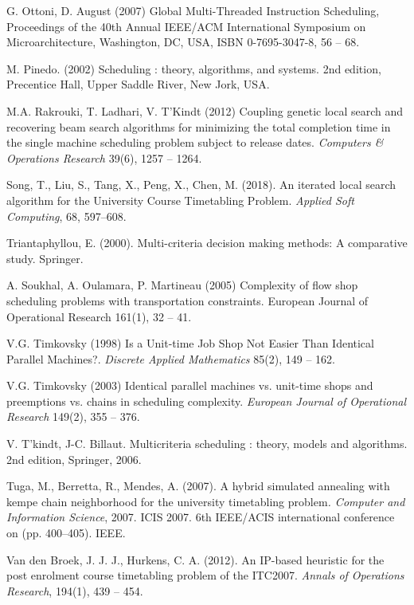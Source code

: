 \documentclass[11pt]{article}
\begin{document}
\begin{thebibliography}{19}
G. Ottoni, D. August (2007) 
Global Multi-Threaded Instruction Scheduling, Proceedings of the 40th Annual IEEE/ACM International Symposium on Microarchitecture, Washington, DC, USA, ISBN 0-7695-3047-8, 56 -- 68.

M. Pinedo. (2002)
Scheduling : theory, algorithms, and systems. 2nd edition, Precentice Hall, Upper Saddle River, New Jork, USA.

M.A. Rakrouki, T. Ladhari, V. T'Kindt (2012) 
Coupling genetic local search and recovering beam search algorithms for minimizing the total completion time in the single machine scheduling problem subject to release dates. 
\textit{Computers \& Operations Research} 39(6), 1257 -- 1264.

Song, T., Liu, S., Tang, X., Peng, X., Chen, M. (2018). 
An iterated local search algorithm for the University Course Timetabling Problem. 
\textit{Applied Soft Computing}, 68, 597–608. 

Triantaphyllou, E. (2000). 
Multi-criteria decision making methods: A comparative study. Springer. 

A. Soukhal, A. Oulamara, P. Martineau (2005) 
Complexity of flow shop scheduling problems with transportation constraints. 
European Journal of Operational Research 161(1), 32 -- 41.

V.G. Timkovsky (1998) 
Is a Unit-time Job Shop Not Easier Than Identical Parallel Machines?. 
\textit{Discrete Applied Mathematics} 85(2), 149 -- 162.

V.G. Timkovsky (2003) 
Identical parallel machines vs. unit-time shops and preemptions vs. chains in scheduling complexity. 
\textit{European Journal of Operational Research} 149(2), 355 -- 376.

V. T'kindt, J-C. Billaut. 
Multicriteria scheduling : theory, models and algorithms. 2nd edition, Springer, 2006.

Tuga, M., Berretta, R., Mendes, A. (2007). 
A hybrid simulated annealing with kempe chain neighborhood for the university timetabling problem\textit{. 
Computer and Information Science}, 2007. ICIS 2007. 6th IEEE/ACIS international conference on (pp. 400--405). IEEE.
 
Van den Broek, J. J. J., Hurkens, C. A. (2012). 
An IP-based heuristic for the post enrolment course timetabling problem of the ITC2007. 
\textit{Annals of Operations Research}, 194(1), 439 -- 454.


\end{thebibliography}
\end{document}
